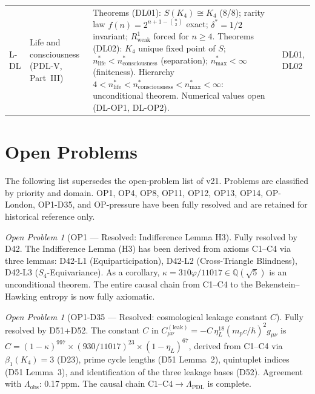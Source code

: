 \documentclass[11pt,a4paper]{article}
\theoremstyle{plain}
\theoremstyle{definition}
\theoremstyle{remark}
\newtheorem{openproblem}[theorem]{Open Problem}
\begin{document}
\begin{longtable}{L{0.6cm}L{3.0cm}L{5.5cm}L{4.0cm}}
L-DL & Life and consciousness (PDL-V, Part~III) & \textcolor{proofblue}{Theorems} (DL01): $S(K_4)\cong K_4$ (8/8); rarity law $f(n)=2^{n+1-\binom{n}{2}}$ exact; $\delta^*=1/2$ invariant; $R^1_{\mathrm{weak}}$ forced for $n\geq 4$. \textcolor{proofblue}{Theorems} (DL02): $K_4$ unique fixed point of $S$; $n^*_{\mathrm{life}} < n^*_{\mathrm{consciousness}}$ (separation); $n^*_{\mathrm{max}}<\infty$ (finiteness). Hierarchy $4 < n^*_{\mathrm{life}} < n^*_{\mathrm{consciousness}} < n^*_{\mathrm{max}} < \infty$: unconditional theorem. Numerical values open (DL-OP1, DL-OP2). & DL01, DL02\\[0.3em]
\end{longtable}

\section{Open Problems}
\label{sec:openproblems}

The following list supersedes the open-problem list of v21. Problems are classified by priority and domain. OP1, OP4, OP8, OP11, OP12, OP13, OP14, OP-London, OP1-D35, and OP-pressure have been fully resolved and are retained for historical reference only.

\begin{openproblem}[OP1 --- Resolved: Indifference Lemma H3]
\label{op:H3}
\textcolor{proofblue}{Fully resolved by D42.} The Indifference Lemma (H3) has been derived from axioms C1--C4 via three lemmas: D42-L1 (Equiparticipation), D42-L2 (Cross-Triangle Blindness), D42-L3 ($S_4$-Equivariance). As a corollary, $\kappa=310\varphi/11017\in\mathbb{Q}(\sqrt{5})$ is an unconditional theorem. The entire causal chain from C1--C4 to the Bekenstein--Hawking entropy is now fully axiomatic.
\end{openproblem}

\begin{openproblem}[OP1-D35 --- Resolved: cosmological leakage constant $C$]
\label{op:leakconstant}
\textcolor{proofblue}{Fully resolved by D51+D52.} The constant $C$ in $C^{(\mathrm{leak})}_{\mu\nu}=-C\,\eta_L^{18}(m_p c/\hbar)^2 g_{\mu\nu}$ is $C=(1-\kappa)^{997}\times(930/11017)^{23}\times(1-\eta_L)^{67}$, derived from C1--C4 via $\beta_1(K_4)=3$ (D23), prime cycle lengths (D51 Lemma~2), quintuplet indices (D51 Lemma~3), and identification of the three leakage bases (D52). Agreement with $\Lambda_{\mathrm{obs}}$: 0.17\,ppm. The causal chain $\mathrm{C1\text{--}C4}\to\Lambda_{\mathrm{PDL}}$ is complete.
\end{openproblem}
\end{document}
